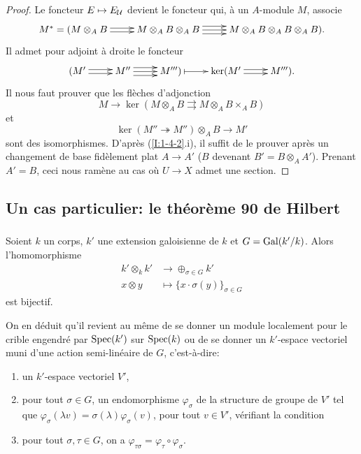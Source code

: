 \documentclass[oneside]{book}
\begin{document}
\begin{proof}
Le foncteur $E\mapsto E_{\mathcal{U}}$ devient le foncteur qui, à un $A$-module $M$, 
associe 
\[\xymatrix{
  M^* = (M\otimes_A B \ar@<2pt>[r] \ar@<-2pt>[r] 
    & M\otimes_A B\otimes_A B \ar@<-4pt>[r] \ar[r] \ar@<4pt>[r] 
    & M\otimes_A B\otimes_A B\otimes_A B)\text{.}
}\]
Il admet pour adjoint à droite le foncteur
\[\xymatrix{
  (M' \ar@<2pt>[r] \ar@<-2pt>[r] 
    & M'' \ar@<-4pt>[r] \ar[r] \ar@<4pt>[r]
    & M''') \ar@{|->}[r] 
    & \ker(M' \ar@<2pt>[r] \ar@<-2pt>[r] 
    & M''')\text{.}
}\]
Il nous faut prouver que les flèches d'adjonction 
\[
  M \to\ker(M\otimes_A B\rightrightarrows M\otimes_A B\times_A B)
\]
et
\[
  \ker(M''\twoheadrightarrow M'')\otimes_A B \to M'
\]
sont des isomorphismes. D'après (\ref{I:1-4-2}.i), il suffit de le prouver 
après un changement de base fidèlement plat $A\to A'$ ($B$ devenant 
$B'=B\otimes_A A'$). Prenant $A'=B$, ceci nous ramène au cas où $U\to X$ 
admet une section. 
\end{proof}










\subsection{Un cas particulier: le théorème 90 de Hilbert}\label{I:1-5}





\subsubsection{}\label{I:1-5-1}

Soient $k$ un corps, $k'$ une extension galoisienne de $k$ et $G=\operatorname{Gal}(k'/k)$. 
Alors l'homomorphisme 
\begin{align*}
  k'\otimes_k k' &\to \oplus_{\sigma\in G} k' \\
  x\otimes y     &\mapsto \{x\cdot \sigma(y)\}_{\sigma\in G}
\end{align*}
est bijectif. 

On en déduit qu'il revient au même de se donner un module localement pour 
le crible engendré par $\operatorname{Spec}(k')$ sur $\operatorname{Spec}(k)$ ou de se donner un 
$k'$-espace vectoriel muni d'une action semi-linéaire de $G$, c'est-à-dire: 
\begin{enumerate}[\indent a)]
  \item un $k'$-espace vectoriel $V'$,
  \item pour tout $\sigma\in G$, un endomorphisme $\varphi_\sigma$ de la 
    structure de groupe de $V'$ tel que 
    $\varphi_\sigma(\lambda v) = \sigma(\lambda) \varphi_\sigma(v)$, pour 
    tout $v\in V'$, vérifiant la condition 
  \item pour tout $\sigma,\tau\in G$, on a 
    $\varphi_{\tau\sigma} = \varphi_\tau\circ\varphi_\sigma$. 
\end{enumerate}
\end{document}
